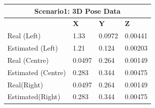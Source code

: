 \begin{table}[H]
  \centering
  \begin{tabular}{ |p{4cm}|p{2cm}|p{2cm}|p{2cm}|  }
    \hline
    \multicolumn{4}{|c|}{Scenario1: 3D Pose Data} \\
    \hline
    & \textbf{X} & \textbf{Y} & \textbf{Z} \\
    \hline
    Real (Left) & 1.33 & 0.0972 & 0.00441 \\
    Estimated (Left) & 1.21 & 0.124 & 0.00203 \\
    \hline
    Real (Centre) & 0.0497 & 0.264 & 0.00149 \\
    Estimated (Centre) & 0.283 & 0.344 & 0.00475 \\
    \hline
    Real(Right) & 0.0497 & 0.264 & 0.00149 \\
    Estimated(Right) & 0.283 & 0.344 & 0.00475 \\
    \hline
  \end{tabular}
\end{table}
